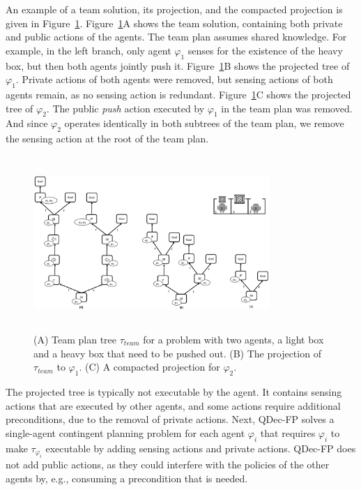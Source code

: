 \documentclass[letterpaper]{article} %
\theoremstyle{definition}
\begin{document}
An example of a team solution, its projection, and the compacted projection is given in Figure~\ref{fig:projected}.  Figure~\ref{fig:projected}A shows the team solution, containing both private and public actions of the %
agents. The team plan assumes shared knowledge.
For example, 
in the left branch, only agent $\varphi_1$ senses for the existence of the heavy box, but then both agents jointly push it. Figure~\ref{fig:projected}B shows the projected tree of $\varphi_1$. Private actions of both agents were removed, but sensing actions of both agents remain,
as no sensing action is redundant. Figure~\ref{fig:projected}C shows the projected tree of $\varphi_2$. The public {\em push} action executed by $\varphi_1$ in the team plan was removed. And since $\varphi_2$ operates identically in both subtrees of the team plan, we remove the sensing action at the root of the team plan. 

\begin{figure}[h!]
\centering
\includegraphics[width=0.8\textwidth, height=2.6in]{main-projection.pdf}
\caption{(A) Team plan tree $\tau_{team}$ for a problem with two agents, a light box and a heavy box that need to be pushed out.
(B) The projection of $\tau_{team}$ to $\varphi_1$.
(C) A compacted projection for $\varphi_2$.
}
\label{fig:projected}
\end{figure}

The projected tree is typically not executable by the agent. It contains sensing actions that are executed by other agents, and some actions require additional preconditions, due to the removal of private actions.
Next, QDec-FP solves a single-agent contingent planning problem for each agent $\varphi_i$ that requires $\varphi_i$ to make $\tau_{\varphi_i}$ executable by adding sensing actions and private actions. 
QDec-FP does not add public actions, as they could interfere with the policies of the other agents by, e.g., consuming a precondition that is needed.  
\end{document}
